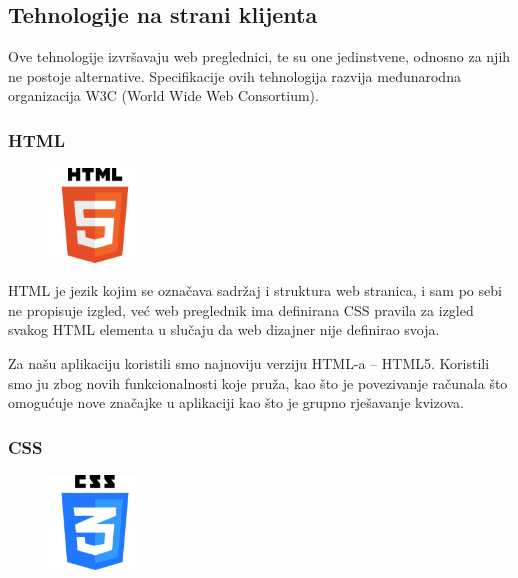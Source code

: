 \documentclass[11pt]{scrreprt}
\begin{document}
\subsection{Tehnologije na strani klijenta}

Ove tehnologije izvršavaju web preglednici, te su one jedinstvene, odnosno za
njih ne postoje alternative. Specifikacije ovih tehnologija razvija međunarodna
organizacija W3C (World Wide Web Consortium).\cite{w3c}

\subsubsection{HTML}

\begin{figure}
  \vspace{-10pt}
  \includegraphics[width=2.5cm]{logos/html}
  \vspace{-30pt}
\end{figure}

HTML je jezik kojim se označava sadržaj i struktura web stranica, i sam po sebi
ne propisuje izgled, već web preglednik ima definirana CSS pravila za izgled
svakog HTML elementa u slučaju da web dizajner nije definirao svoja.\cite{html}

Za našu aplikaciju koristili smo najnoviju verziju HTML-a -- HTML5. Koristili
smo ju zbog novih funkcionalnosti koje pruža, kao što je povezivanje računala
što omogućuje nove značajke u aplikaciji kao što je grupno rješavanje kvizova.

\subsubsection{CSS}

\begin{figure}
  \vspace{-10pt}
  \includegraphics[width=2.5cm]{logos/css}
  \vspace{-30pt}
\end{figure}
\end{document}
